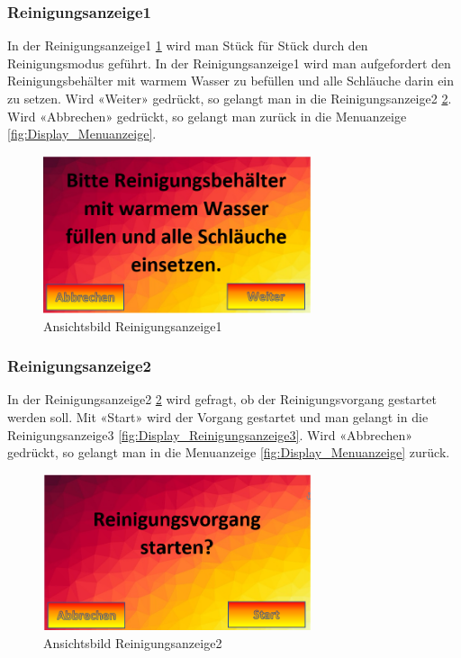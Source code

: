 \subsubsection{Reinigungsanzeige1}\label{subsubsec:Display_Reinigungsanzeige1}

In der Reinigungsanzeige1 \ref{fig:Display_Reinigungsanzeige1} wird man Stück für Stück durch den Reinigungsmodus geführt. In der Reinigungsanzeige1 wird man aufgefordert den Reinigungsbehälter mit warmem Wasser zu befüllen und alle Schläuche darin ein zu setzen. Wird «Weiter» gedrückt, so gelangt man in die Reinigungsanzeige2 \ref{fig:Display_Reinigungsanzeige2}. Wird «Abbrechen» gedrückt, so gelangt man zurück in die Menuanzeige \ref{fig:Display_Menuanzeige}.

\begin{figure}[h!]
\centering
\includegraphics[width=0.7\textwidth]{graphics/Display_Reinigungsanzeige1.png}
\caption{Ansichtsbild Reinigungsanzeige1}
\label{fig:Display_Reinigungsanzeige1}
\end{figure}

\subsubsection{Reinigungsanzeige2}\label{subsubsec:Display_Reinigungsanzeige2}

In der Reinigungsanzeige2 \ref{fig:Display_Reinigungsanzeige2} wird gefragt, ob der Reinigungsvorgang gestartet werden soll. Mit «Start» wird der Vorgang gestartet und man gelangt in die Reinigungsanzeige3 \ref{fig:Display_Reinigungsanzeige3}. Wird «Abbrechen» gedrückt, so gelangt man in die Menuanzeige \ref{fig:Display_Menuanzeige} zurück.

\begin{figure}[h!]
\centering
\includegraphics[width=0.7\textwidth]{graphics/Display_Reinigungsanzeige2.png}
\caption{Ansichtsbild Reinigungsanzeige2}
\label{fig:Display_Reinigungsanzeige2}
\end{figure}

